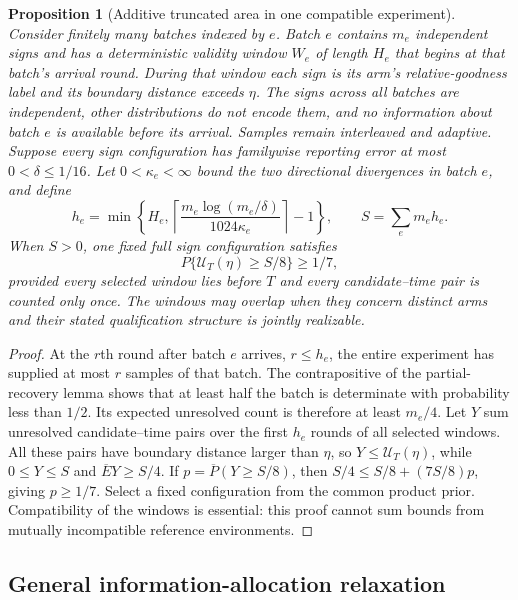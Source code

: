\documentclass[11pt]{article}
\newtheorem{proposition}[theorem]{Proposition}
\theoremstyle{remark}
\begin{document}
\begin{proposition}[Additive truncated area in one compatible experiment]
\label{prop:truncated_windows}
Consider finitely many batches indexed by $e$. Batch $e$ contains $m_e$
independent signs and has a deterministic validity window $W_e$ of length
$H_e$ that begins at that batch's arrival round. During that window each sign
is its arm's relative-goodness label and
its boundary distance exceeds $\eta$. The signs across all batches are
independent, other distributions do not encode them, and no information
about batch $e$ is available before its arrival. Samples remain interleaved
and adaptive. Suppose every sign configuration has familywise reporting error
at most $0<\delta\le1/16$. Let $0<\kappa_e<\infty$ bound the two directional
divergences in batch $e$, and define
\[
 h_e=\min\left\{H_e,
 \left\lceil\frac{m_e\log(m_e/\delta)}{1024\kappa_e}\right\rceil-1\right\},
 \qquad S=\sum_e m_eh_e.
\]
When $S>0$, one fixed full sign configuration satisfies
\[
 P\{\mathcal U_T(\eta)\ge S/8\}\ge1/7,
\]
provided every selected window lies before $T$ and every candidate--time pair
is counted only once. The windows may overlap when they concern distinct
arms and their stated qualification structure is jointly realizable.
\end{proposition}
\begin{proof}
At the $r$th round after batch $e$ arrives, $r\le h_e$, the entire experiment
has supplied at most $r$ samples of that batch. The contrapositive of the
partial-recovery lemma shows that at least half the batch is determinate with
probability less than $1/2$. Its expected unresolved count is therefore at
least $m_e/4$. Let $Y$ sum unresolved candidate--time pairs over the first
$h_e$ rounds of all selected windows. All these pairs have boundary distance
larger than $\eta$, so $Y\le\mathcal U_T(\eta)$, while $0\le Y\le S$ and
$\overline EY\ge S/4$. If $p=\overline P(Y\ge S/8)$, then
$S/4\le S/8+(7S/8)p$, giving $p\ge1/7$. Select a fixed configuration from
the common product prior. Compatibility of the windows is essential: this
proof cannot sum bounds from mutually incompatible reference environments.
\end{proof}

\subsection{General information-allocation relaxation}
\label{app:information}
\end{document}
